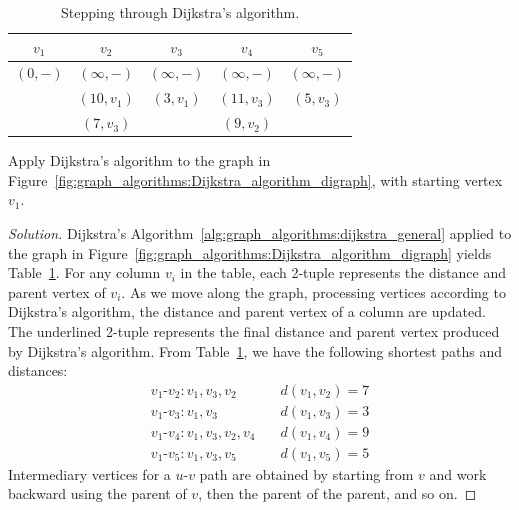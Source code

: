 \begin{table}[!htbp]
\centering
\begin{tabular}{|ccccc|} \hline
$v_1$               & $v_2$                 & $v_3$                 & $v_4$                 & $v_5$ \\\hline\hline
\underline{$(0,-)$} & $(\infty,-)$          & $(\infty,-)$          & $(\infty,-)$          & $(\infty,-)$ \\
                    & $(10,v_1)$            & \underline{$(3,v_1)$} & $(11,v_3)$            & \underline{$(5,v_3)$} \\
                    & \underline{$(7,v_3)$} &                       & \underline{$(9,v_2)$} & \\\hline
\end{tabular}
\caption{Stepping through Dijkstra's algorithm.}
\label{tab:graph_algorithms:working_through_Dijkstra_algorithm}
\end{table}

\begin{example}
Apply Dijkstra's algorithm to the graph in
Figure~\ref{fig:graph_algorithms:Dijkstra_algorithm_digraph}, with
starting vertex $v_1$.
\end{example}

\begin{proof}[Solution]
Dijkstra's Algorithm~\ref{alg:graph_algorithms:dijkstra_general}
applied to the graph in
Figure~\ref{fig:graph_algorithms:Dijkstra_algorithm_digraph} yields
Table~\ref{tab:graph_algorithms:working_through_Dijkstra_algorithm}. For
any column $v_i$ in the table, each 2-tuple represents the distance
and parent vertex of $v_i$. As we move along the graph, processing
vertices according to Dijkstra's algorithm, the distance and parent
vertex of a column are updated. The underlined 2-tuple represents the
final distance and parent vertex produced by Dijkstra's
algorithm. From
Table~\ref{tab:graph_algorithms:working_through_Dijkstra_algorithm},
we have the following shortest paths and distances:
\[
\begin{array}{ll}
v_1\text{-}v_2: v_1, v_3, v_2      &\quad d(v_1, v_2) = 7 \\[4pt]
v_1\text{-}v_3: v_1, v_3           &\quad d(v_1, v_3) = 3 \\[4pt]
v_1\text{-}v_4: v_1, v_3, v_2, v_4 &\quad d(v_1, v_4) = 9 \\[4pt]
v_1\text{-}v_5: v_1, v_3, v_5      &\quad d(v_1, v_5) = 5
\end{array}
\]
Intermediary vertices for a $u$-$v$ path are obtained by starting from
$v$ and work backward using the parent of $v$, then the parent of the
parent, and so on.
\end{proof}

